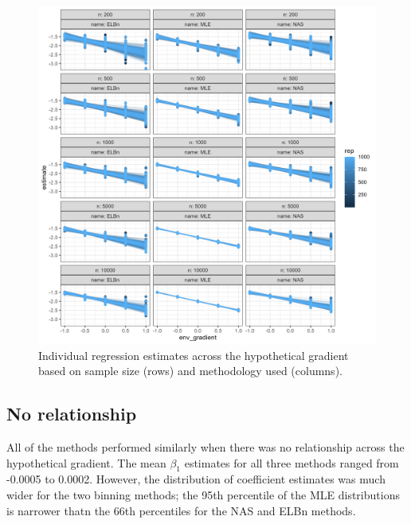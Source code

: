\documentclass[
]{article}
\begin{document}
\begin{figure}
\centering
\includegraphics{figures/n_vary_main.png}
\caption{Individual regression estimates across the hypothetical
gradient based on sample size (rows) and methodology used (columns).}
\end{figure}

\newpage

\hypertarget{no-relationship-1}{%
\subsection{No relationship}\label{no-relationship-1}}

All of the methods performed similarly when there was no relationship
across the hypothetical gradient. The mean \(\beta_1\) estimates for all
three methods ranged from -0.0005 to 0.0002. However, the distribution
of coefficient estimates was much wider for the two binning methods; the
95th percentile of the MLE distributions is narrower thatn the 66th
percentiles for the NAS and ELBn methods.
\end{document}
